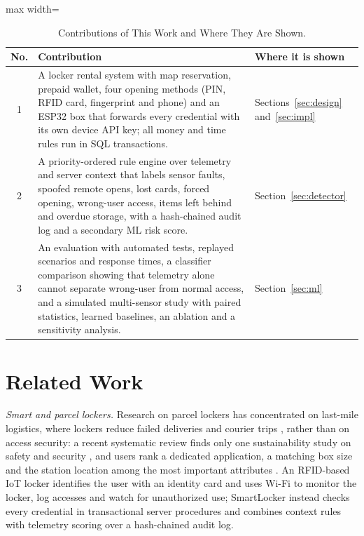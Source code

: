 \documentclass[sigconf,screen]{acmart}
\begin{document}
\begin{table}[tbp]
\centering
\footnotesize
\caption{Contributions of This Work and Where They Are Shown.}
\label{tab:contrib}
\begin{adjustbox}{max width=\textwidth}
\begin{tabular}{c p{11.9cm} p{2.7cm}}
\toprule
No. & Contribution & Where it is shown \\
\midrule
1 & A locker rental system with map reservation, prepaid wallet, four opening methods (PIN, RFID card, fingerprint and
    phone) and an ESP32 box that forwards every credential with its own device API key; all money and time rules run in SQL transactions. & Sections~\ref{sec:design} and~\ref{sec:impl} \\
2 & A priority-ordered rule engine over telemetry and server context that labels sensor faults, spoofed remote opens,
    lost cards, forced opening, wrong-user access, items left behind and overdue storage, with a hash-chained audit log and a secondary ML risk score. & Section~\ref{sec:detector} \\
3 & An evaluation with automated tests, replayed scenarios and response times, a classifier comparison showing that
    telemetry alone cannot separate wrong-user from normal access, and a simulated multi-sensor study with paired
    statistics, learned baselines, an ablation and a sensitivity analysis. & Section~\ref{sec:ml} \\
\bottomrule
\end{tabular}
\end{adjustbox}
\end{table}

\section{Related Work}

\textit{Smart and parcel lockers.} Research on parcel lockers has concentrated on last-mile logistics, where lockers
reduce failed deliveries and courier trips \cite{iwan2016parcel}, rather than on access security: a recent systematic
review finds only one sustainability study on safety and security \cite{zhang2025parcel}, and users rank a dedicated
application, a matching box size and the station location among the most important attributes
\cite{ciesla2023parcel}. An RFID-based IoT locker \cite{rfidiot2023locker} identifies the user with an identity card
and uses Wi-Fi to monitor the locker, log accesses and watch for unauthorized use; SmartLocker instead checks every
credential in transactional server procedures and combines context rules with telemetry scoring over a hash-chained
audit log.
\end{document}
